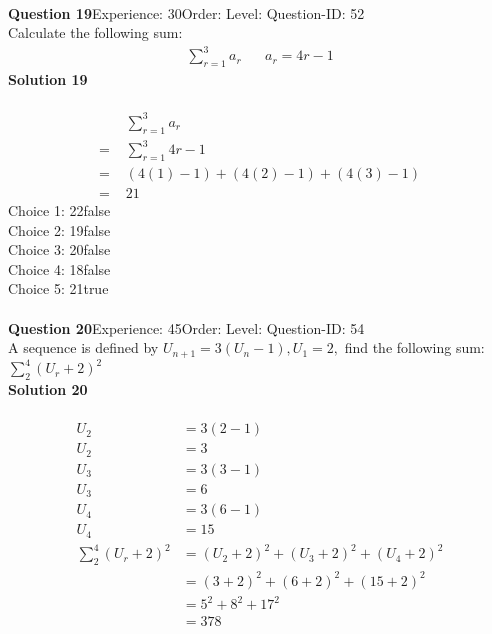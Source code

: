 \documentclass{article}
\begin{document}
\\[4pt]
\noindent\textbf{Question 19}\hspace{20pt}Experience: 30\hspace{20pt}Order: \hspace{20pt}Level: \hspace{20pt}Question-ID: 52\\[2pt]
Calculate the following sum:
\begin{align*}
\sum_{r=1}^{3} a_r \hspace{20pt}a_r=4r-1
\end{align*}
\noindent\textbf{Solution 19}\\[2pt]
\\[-35pt]\begin{align*}
&\sum_{r=1}^{3} a_r\\[2pt]
=\,\,&\sum_{r=1}^{3} 4r-1\\[2pt]
=\,\,&(4(1)-1)+(4(2)-1)+(4(3)-1) \\[2pt]
=\,\,&21
\end{align*}
Choice 1: \hspace{20pt}22\hspace{20pt}false\\
Choice 2: \hspace{20pt}19\hspace{20pt}false\\
Choice 3: \hspace{20pt}20\hspace{20pt}false\\
Choice 4: \hspace{20pt}18\hspace{20pt}false\\
Choice 5: \hspace{20pt}21\hspace{20pt}true\\
\\[4pt]
\noindent\textbf{Question 20}\hspace{20pt}Experience: 45\hspace{20pt}Order: \hspace{20pt}Level: \hspace{20pt}Question-ID: 54\\[2pt]
A sequence is defined by $U_{n+1}=3(U_n -1), U_1=2,$ find the following sum: $\displaystyle\sum_{2}^{4} (U_r+2)^2$\\[4pt]
\noindent\textbf{Solution 20}\\[2pt]
\\[-35pt]\begin{align*}
U_2&=3(2-1)\\[2pt]
U_2&=3\\[12pt]
U_3&=3(3-1)\\[2pt]
U_3&=6\\[12pt]
U_4&=3(6-1)\\[2pt]
U_4&=15\\[12pt]
\displaystyle\sum_{2}^{4} (U_r+2)^2&=(U_2+2)^2+(U_3+2)^2+(U_4+2)^2\\[2pt]
&=(3+2)^2+(6+2)^2+(15+2)^2\\[2pt]
&=5^2+8^2+17^2\\[2pt]
&=378
\end{align*}
\end{document}
